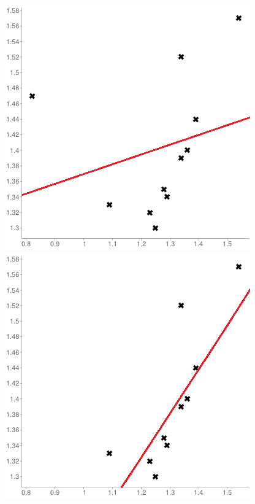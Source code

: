 \begin{figure}[t]
       \centering
 \includegraphics[width=\textwidth]{Images/scatter_plot_linear_1}
 \includegraphics[width=\textwidth]{Images/scatter_plot_linear_2}

\end{figure}
